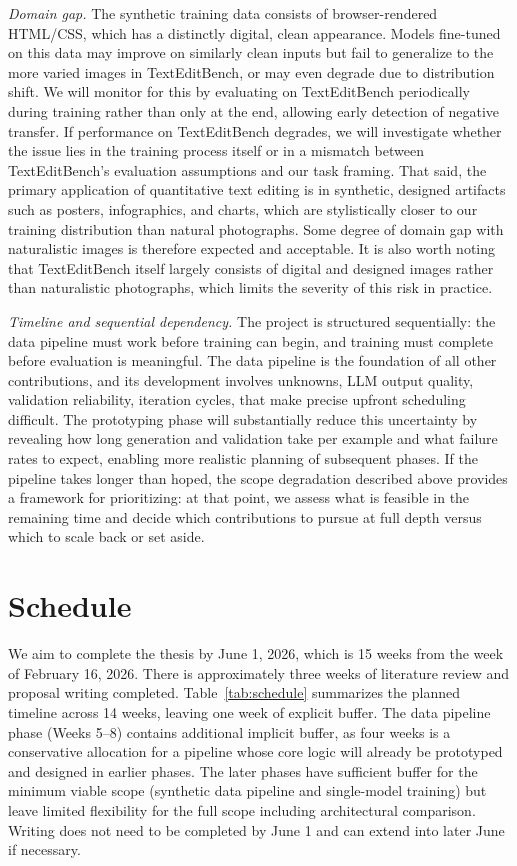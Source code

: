 \textit{Domain gap.} The synthetic training data consists of browser-rendered HTML/CSS, which has a distinctly digital, clean appearance. Models fine-tuned on this data may improve on similarly clean inputs but fail to generalize to the more varied images in TextEditBench, or may even degrade due to distribution shift. We will monitor for this by evaluating on TextEditBench periodically during training rather than only at the end, allowing early detection of negative transfer. If performance on TextEditBench degrades, we will investigate whether the issue lies in the training process itself or in a mismatch between TextEditBench's evaluation assumptions and our task framing. That said, the primary application of quantitative text editing is in synthetic, designed artifacts such as posters, infographics, and charts, which are stylistically closer to our training distribution than natural photographs. Some degree of domain gap with naturalistic images is therefore expected and acceptable. It is also worth noting that TextEditBench itself largely consists of digital and designed images rather than naturalistic photographs, which limits the severity of this risk in practice.

\textit{Timeline and sequential dependency.} The project is structured sequentially: the data pipeline must work before training can begin, and training must complete before evaluation is meaningful. The data pipeline is the foundation of all other contributions, and its development involves unknowns, LLM output quality, validation reliability, iteration cycles, that make precise upfront scheduling difficult. The prototyping phase will substantially reduce this uncertainty by revealing how long generation and validation take per example and what failure rates to expect, enabling more realistic planning of subsequent phases. If the pipeline takes longer than hoped, the scope degradation described above provides a framework for prioritizing: at that point, we assess what is feasible in the remaining time and decide which contributions to pursue at full depth versus which to scale back or set aside.


\chapter{Schedule} \label{Schedule}

We aim to complete the thesis by June 1, 2026, which is 15 weeks from the week of February 16, 2026. There is approximately three weeks of literature review and proposal writing completed. Table~\ref{tab:schedule} summarizes the planned timeline across 14 weeks, leaving one week of explicit buffer. The data pipeline phase (Weeks 5--8) contains additional implicit buffer, as four weeks is a conservative allocation for a pipeline whose core logic will already be prototyped and designed in earlier phases. The later phases have sufficient buffer for the minimum viable scope (synthetic data pipeline and single-model training) but leave limited flexibility for the full scope including architectural comparison. Writing does not need to be completed by June 1 and can extend into later June if necessary.

